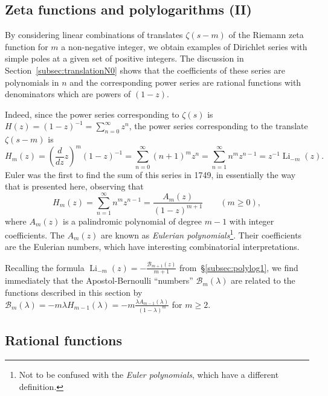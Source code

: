 \documentclass[11pt,a4paper]{amsart}
\newcommand{\AB}{\mathcal{B}}
\newcommand{\Li}{\operatorname{Li}}
\theoremstyle{plain}
\theoremstyle{plain}
\theoremstyle{plain}
\theoremstyle{definition}
\theoremstyle{remark}
\begin{document}
\subsection{Zeta functions and polylogarithms (II)}
\label{subsec:polylog2}

By considering linear combinations of translates $\zeta(s-m)$ of the Riemann zeta function for $m$ a non-negative integer, we obtain examples of Dirichlet series with simple poles at a given set of positive integers. The discussion in Section~\ref{subsec:translationN0} shows that the coefficients of these series are polynomials in $n$ and the corresponding power series are rational functions with  denominators which are powers of $(1-z)$.


Indeed, since the power series corresponding to $\zeta(s)$ is $H(z) = (1-z)^{-1} = \sum_{n=0}^{\infty} z^{n}$, the power series corresponding to the translate $\zeta(s-m)$ is 
\[
  H_{m}(z) = \left(\frac{d}{dz} z\right)^{\!\!m} \!\!(1-z)^{-1}
  = \sum_{n=0}^{\infty} (n+1)^{m} z^{n}
  = \sum_{n=1}^{\infty} n^{m} z^{n-1}
  = z^{-1} \Li_{-m}(z).
\]
Euler was the first to find the sum of this series in 1749, in essentially the way that is presented here, observing that
\[
  H_{m}(z) = \sum_{n=1}^{\infty} n^m z^{n-1} = \frac{A_m(z)}{(1-z)^{m+1}}
  \qquad
  (m \geq 0),
\]
where $A_{m}(z)$ is a palindromic polynomial of degree $m-1$ with integer coefficients. The $A_{m}(z)$ are known as \emph{Eulerian polynomials}\footnote{Not to be confused with the \emph{Euler polynomials}, which have a different definition.}. Their coefficients are the Eulerian numbers, which have interesting combinatorial interpretations.

Recalling the formula $\Li_{-m}(z) = -\frac{\AB_{m+1}(z)}{m+1}$ from~\S\ref{subsec:polylog1}, we find immediately that the Apostol-Bernoulli ``numbers'' $\AB_{m}(\lambda)$ are related to the functions described in this section by $\AB_{m}(\lambda) = -m \lambda H_{m-1}(\lambda) = -m \frac{\lambda A_{m-1}(\lambda)}{(1-\lambda)^{m}}$ for $m \geq 2$. 

\subsection{Rational functions}
\label{subsec:rational}
\end{document}
